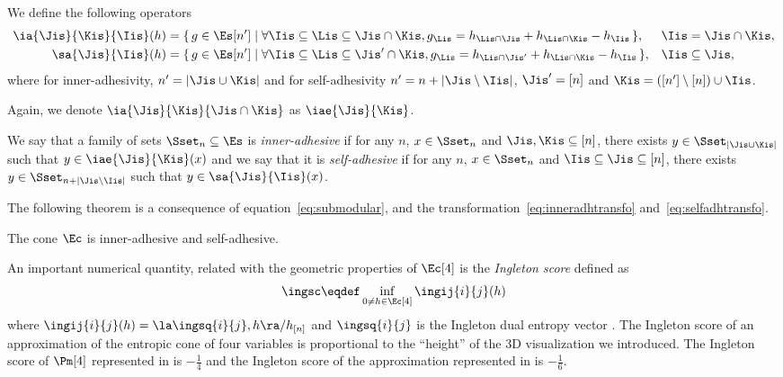 \documentclass[11pt,twoside,a4paper,openright]{uclouvain-thesis}
\begin{document}
We define the following operators
\begin{align*}
  \ia{\Jis}{\Kis}{\Iis}(h) & = \{\, g \in \Es[n'] \mid \forall \Iis \subseteq \Lis \subseteq \Jis \cap \Kis, g_{\Lis} = h_{\Lis \cap \Jis} + h_{\Lis \cap \Kis} - h_{\Iis} \,\}, & \Iis & = \Jis \cap \Kis,\\
  \sa{\Jis}{\Iis}(h) & = \{\, g \in \Es[n'] \mid \forall \Iis \subseteq \Lis \subseteq \Jis' \cap \Kis, g_{\Lis} = h_{\Lis \cap \Jis'} + h_{\Lis \cap \Kis} - h_{\Iis} \,\}, & \Iis & \subseteq \Jis,
\end{align*}
where for inner-adhesivity, $n' = |\Jis\cup\Kis|$ and for self-adhesivity $n' = n + |\Jis \setminus \Iis|$, $\Jis' = [n]$ and $\Kis = ([n'] \setminus [n]) \cup \Iis$.

Again, we denote $\ia{\Jis}{\Kis}{\Jis \cap \Kis}$ as $\iae{\Jis}{\Kis}$.

\begin{mydef}
  We say that a family of sets $\Sset_n \subseteq \Es$ is \emph{inner-adhesive} if for any $n$, $x \in \Sset_n$ and $\Jis, \Kis \subseteq [n]$,
  there exists $y \in \Sset_{|\Jis\cup\Kis|}$ such that $y \in \iae{\Jis}{\Kis}(x)$ and
  we say that it is \emph{self-adhesive} if for any $n$, $x \in \Sset_n$ and $\Iis \subseteq \Jis \subseteq [n]$,
  there exists $y \in \Sset_{n + |\Jis \setminus \Iis|}$ such that $y \in \sa{\Jis}{\Iis}(x)$.
\end{mydef}

The following theorem is a consequence of equation~\eqref{eq:submodular}, and the transformation~\eqref{eq:inneradhtransfo} and~\eqref{eq:selfadhtransfo}.
\begin{mytheo}
  \label{theo:adh}
  The cone $\Ec$ is inner-adhesive and self-adhesive.
\end{mytheo}

An important numerical quantity, related with the geometric properties of $\Ec[4]$ is the \emph{Ingleton score} defined as
\begin{equation}
  \label{eq:ingleton}
  \ingsc \eqdef \inf_{0 \neq h \in \Ec[4]} \ingij{i}{j}(h)
\end{equation}
where $\ingij{i}{j}(h) = \la \ingsq{i}{j}, h \ra / h_{[n]}$ \cite[Definition~3]{dougherty2011non} and $\ingsq{i}{j}$ is the Ingleton dual entropy vector \cite{ingleton1971conditions}.
The Ingleton score of an approximation of the entropic cone of four variables is proportional to the ``height'' of the 3D visualization we introduced.
The Ingleton score of $\Pm[4]$ represented in  is $-\frac{1}{4}$ and the Ingleton score of the approximation represented in  is $-\frac{1}{6}$.
\end{document}
